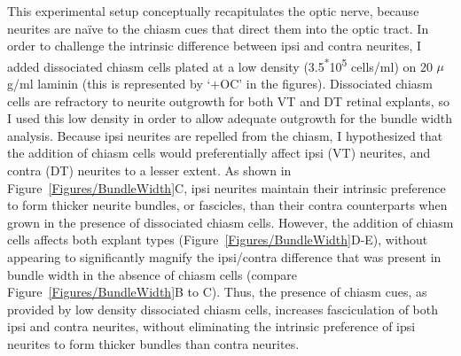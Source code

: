 This experimental setup conceptually recapitulates the optic nerve, because neurites are na\"ive to the chiasm cues that direct them into the optic tract.
In order to challenge the intrinsic difference between ipsi and contra neurites, I added dissociated chiasm cells plated at a low density (3.5\textsuperscript{*}10\textsuperscript{5} cells/ml) on 20 $\mu$g/ml laminin (this is represented by `+OC' in the figures).
Dissociated chiasm cells are refractory to neurite outgrowth for both VT and DT retinal explants, so I used this low density in order to allow adequate outgrowth for the bundle width analysis.
Because ipsi neurites are repelled from the chiasm, I hypothesized that the addition of chiasm cells would preferentially affect ipsi (VT) neurites, and contra (DT) neurites to a lesser extent.
As shown in Figure~\ref{Figures/BundleWidth}C, ipsi neurites maintain their intrinsic preference to form thicker neurite bundles, or fascicles, than their contra counterparts when grown in the presence of dissociated chiasm cells.
However, the addition of chiasm cells affects both explant types (Figure~\ref{Figures/BundleWidth}D-E), without appearing to significantly magnify the ipsi/contra difference that was present in bundle width in the absence of chiasm cells (compare Figure~\ref{Figures/BundleWidth}B to C).
Thus, the presence of chiasm cues, as provided by low density dissociated chiasm cells, increases fasciculation of both ipsi and contra neurites, without eliminating the intrinsic preference of ipsi neurites to form thicker bundles than contra neurites.

